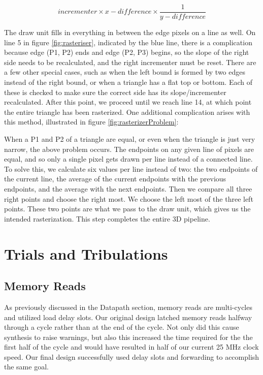 \documentclass[onecolumn]{IEEEtran}
\begin{document}
\begin{equation}
\label{eq:rasterise}
incrementer \times x-difference \times \frac{1}{y-difference}  
\end{equation}

The draw unit fills in everything in between the edge pixels on a line as well.  On line 5 in figure \ref{fig:rasteriser}, indicated by the blue line, there is a complication because edge (P1, P2) ends and edge (P2, P3) begins, so the slope of the right side needs to be recalculated, and the right incrementer must be reset.  There are a few other special cases, such as when the left bound is formed by two edges instead of the right bound, or when a triangle has a flat top or bottom.  Each of these is checked to make sure the correct side has its slope/incrementer recalculated.  After this point, we proceed until we reach line 14, at which point the entire triangle has been rasterized.  One additional complication arises with this method, illustrated in figure \ref{fig:rasterizerProblem}:


When a P1 and P2 of a triangle are equal, or even when the triangle is just very narrow, the above problem occurs.  The endpoints on any given line of pixels are equal, and so only a single pixel gets drawn per line instead of a connected line.  To solve this, we calculate six values per line instead of two: the two endpoints of the current line, the average of the current endpoints with the previous endpoints, and the average with the next endpoints.  Then we compare all three right points and choose the right most.  We choose the left most of the three left points.  These two points are what we pass to the draw unit, which gives us the intended rasterization.  This step completes the entire 3D pipeline.  

\section{Trials and Tribulations}
\subsection{Memory Reads}
As previously discussed in the Datapath section, memory reads are multi-cycles and utilized load delay slots.  Our original design latched memory reads halfway through a cycle rather than at the end of the cycle.  Not only did this cause synthesis to raise warnings, but also this increased the time required for the the first half of the cycle and would have resulted in half of our current 25 MHz clock speed.  Our final design successfully used delay slots and forwarding to accomplish the same goal.
\end{document}
